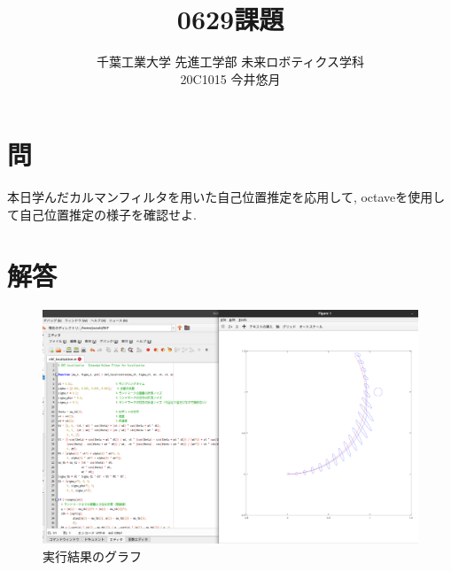 \documentclass{jsarticle}
\begin{document}
\title{{\vspace*{-10mm}}{\LARGE 0629課題}}
\author{\large 千葉工業大学 先進工学部 未来ロボティクス学科 \vspace*{4mm}\\20C1015 今井悠月}
\date{}
\maketitle\vspace*{10mm}
\vspace*{-10mm}

\section*{問}
本日学んだカルマンフィルタを用いた自己位置推定を応用して, octaveを使用して自己位置推定の様子を確認せよ.

\section*{解答}

\begin{figure}[H]
  \centering
   \includegraphics[scale=0.30]{./fig/1.png}
   \caption{実行結果のグラフ}
\end{figure}
\end{document}
